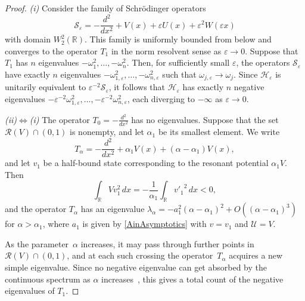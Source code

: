 \documentclass[reqno]{amsart}
\theoremstyle{definition}
\theoremstyle{remark}
\numberwithin{equation}{section}
\newcommand{\Real}{\mathbb R}
\newcommand{\eps}{\varepsilon}
\newcommand{\cH}{\mathcal{H}}
\newcommand{\cU}{\mathcal{U}}
\newcommand{\cR}{\mathcal{R}}
\newcommand{\cS}{\mathcal{S}}
\begin{document}
\begin{proof}
\textit{(i)} Consider the family of  Schr\"{o}dinger operators
\begin{equation*}
 \cS_\eps=-\frac{d^2}{dx^2}+V(x)+ \eps U(x)+\eps^2 W(\eps x)
\end{equation*}
with domain $W^2_2(\Real)$. This family is uniformly bounded from below and converges to the operator $T_1$ in the norm resolvent sense as $\eps\to 0$. Suppose that $T_1$ has $n$ eigenvalues $-\omega_{1}^2,\dots,-\omega_{n}^2$. Then, for sufficiently small $\eps$, the operators $\cS_\eps$ have exactly $n$ eigenvalues $-\omega_{1,\eps}^2,\dots,-\omega_{n,\eps}^2$ such that $\omega_{j,\eps}\to\omega_{j}$. Since $\cH_\eps$ is unitarily equivalent to $\eps^{-2} \cS_\eps$, it follows that $\cH_\eps$ has exactly $n$ negative eigenvalues $-\eps^{-2}\omega_{1,\eps}^2,\dots,-\eps^{-2}\omega_{n,\eps}^2$, each diverging to $-\infty$ as $\eps\to0$.

\textit{(ii)$\Leftrightarrow$(i)} The operator $T_0=-\frac{d^2}{dx^2}$ has no eigenvalues.
Suppose that the set $\cR(V) \cap (0,1)$ is nonempty, and let $\alpha_1$ be its smallest element.
We write
\begin{equation*}
  T_\alpha=-\frac{d^2}{dx^2}+\alpha_1 V(x)+(\alpha-\alpha_1) V(x),
\end{equation*}
and let $v_1$ be a half-bound state corresponding to the resonant potential $\alpha_1V$. Then
\begin{equation*}
  \int_\Real V v_1^2\,dx=-\frac1{\alpha_1}\int_\Real {v'_1}^2\,dx<0,
\end{equation*}
and the operator $T_\alpha$ has an eigenvalue $\lambda_\alpha=-a_1^2(\alpha-\alpha_1)^2+O((\alpha-\alpha_1)^3)$ for $\alpha>\alpha_1$, where $a_1$ is given by \eqref{AinAsymptotics} with $v=v_1$ and $\cU=V$.

As the parameter~$\alpha$ increases, it may pass through further points in $\cR(V) \cap (0,1)$, and at each such crossing the operator~$T_\alpha$ acquires a new simple eigenvalue. Since no negative eigenvalue can get absorbed by the continuous spectrum as $\alpha$ increases~\cite{Klaus1982}, this gives a total count of the negative eigenvalues of $T_1$.



\end{proof}
\end{document}
